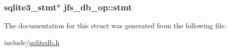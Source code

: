 \label{structjfs__db__op_afbeb729afc20ba8e671ab03a7a7ee864}
\hypertarget{structjfs__db__op_a8adbfebee41154f5fbc3be1256255870}{
\subsubsection[{stmt}]{\setlength{\rightskip}{0pt plus 5cm}sqlite3\_\-stmt$\ast$ {\bf jfs\_\-db\_\-op::stmt}}}
\label{structjfs__db__op_a8adbfebee41154f5fbc3be1256255870}


The documentation for this struct was generated from the following file:\begin{DoxyCompactItemize}
\item 
include/\hyperlink{sqlitedb_8h}{sqlitedb.h}\end{DoxyCompactItemize}
